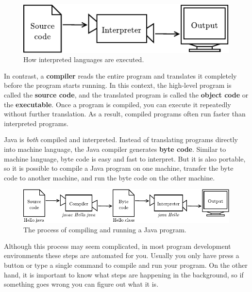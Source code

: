 \documentclass[12pt]{book}
\theoremstyle{exercise}
\begin{document}
\begin{figure}[!h]
\begin{center}
\includegraphics{figs/interpreter.pdf}
\caption{How interpreted languages are executed.}
\end{center}
\end{figure}


In contrast, a {\bf compiler} reads the entire program and translates it completely before the program starts running.
In this context, the high-level program is called the {\bf source code}, and the translated program is called the {\bf object code} or the {\bf executable}.
Once a program is compiled, you can execute it repeatedly without further translation.
As a result, compiled programs often run faster than interpreted programs.


Java is {\em both} compiled and interpreted.
Instead of translating programs directly into machine language, the Java compiler generates {\bf byte code}.
Similar to machine language, byte code is easy and fast to interpret.
But it is also portable, so it is possible to compile a Java program on one machine, transfer the byte code to another machine, and run the byte code on the other machine.

\begin{figure}[!h]
\begin{center}
\includegraphics{figs/compiler.pdf}
\caption{The process of compiling and running a Java program.}
\end{center}
\end{figure}

Although this process may seem complicated, in most program development environments these steps are automated for you.
Usually you only have press a button or type a single command to compile and run your program.
On the other hand, it is important to know what steps are happening in the background, so if something goes wrong you can figure out what it is.
\end{document}
